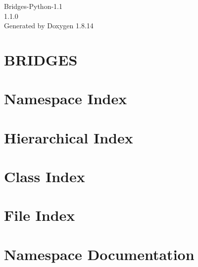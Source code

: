 \documentclass[twoside]{book}
\newcommand{\+}{\discretionary{\mbox{\scriptsize$\hookleftarrow$}}{}{}}
\newcommand{\clearemptydoublepage}{%
  \newpage{\pagestyle{empty}\cleardoublepage}%
}
\begin{document}
\hypersetup{pageanchor=false,
             bookmarksnumbered=true,
             pdfencoding=unicode
            }
\begin{titlepage}
\vspace*{7cm}
\begin{center}%
{\Large Bridges-\/\+Python-\/1.1 \\[1ex]\large 1.\+1.\+0 }\\
\vspace*{1cm}
{\large Generated by Doxygen 1.8.14}\\
\end{center}
\end{titlepage}
\clearemptydoublepage
{}
\tableofcontents
\clearemptydoublepage
{}
\hypersetup{pageanchor=true}

\chapter{B\+R\+I\+D\+G\+ES}
\label{index}\hypertarget{index}{}
\chapter{Namespace Index}

\chapter{Hierarchical Index}

\chapter{Class Index}

\chapter{File Index}

\chapter{Namespace Documentation}























\end{document}
